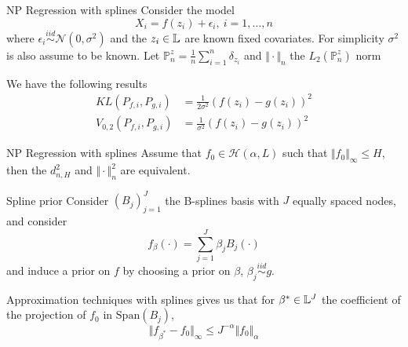 




\begin{frame}{NP Regression with splines}
Consider the model 
$$
X_i = f(z_i) + \epsilon_i, ~ i=1, \dots, n
$$
where $\epsilon_i \overset{iid}{\sim} \mathcal{N}(0,\sigma^2)$ and the $z_i\in \mathbb{L}$ are known fixed covariates. For simplicity $\sigma^2$ is also assume to be known. \pause 
Let $\mathbb{P}_n^z = \frac{1}{n} \sum_{i=1}^n \delta_{z_i}$ and $\Vert \cdot \Vert_n$ the $L_2(\mathbb{P}_n^z)$ norm
\pause

\begin{lemma}
We have the following results
\begin{align*}
KL(P_{f,i},P_{g,i}) &= \frac{1}{2\sigma^2} (f(z_i) - g(z_i))^2 \\ 
 V_{0,2}(P_{f,i},P_{g,i}) &=\frac{1}{\sigma^2} (f(z_i) - g(z_i))^2 
\end{align*}
\end{lemma}
\end{frame}


\begin{frame}{NP Regression with splines}
Assume that $f_0 \in \mathcal{H}(\alpha,L)$ such that $\Vert f_0 \Vert_\infty \leq H$, then the $d_{n,H}^2$ and $\Vert \cdot \Vert_n^2$ are equivalent. 
\pause 
\begin{block}{Spline prior}
Consider $(B_j)_{j=1}^J$ the B-splines basis with $J$ equally spaced nodes, and consider 
$$
f_\beta(\cdot) = \sum_{j=1}^J \beta_j B_j(\cdot)
$$ 
and induce a prior on $f$ by choosing a prior on $\beta$, 
$\beta_j \overset{iid}{\sim} g $.
\end{block}
\pause 
Approximation techniques with splines gives us that for $\beta^* \in \mathbb{L}^J$ the coefficient of the projection of $f_0$ in $\mathrm{Span}(B_j)$, 
$$
\Vert f_{\beta^*} - f_0 \Vert_\infty \leq J^{-\alpha} \Vert f_0 \Vert_\alpha 
$$ 
\end{frame}

